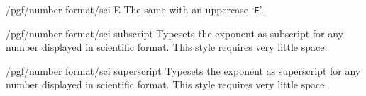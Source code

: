 \begin{key}{/pgf/number format/sci E}
    The same with an uppercase `\texttt{E}'.
\begin{codeexample}[pre={\begin{lateximage}},post={\end{lateximage}}]
\end{codeexample}
\end{key}

\begin{key}{/pgf/number format/sci subscript}
    Typesets the exponent as subscript for any number displayed in scientific
    format. This style requires very little space.
\begin{codeexample}[pre={\begin{lateximage}},post={\end{lateximage}}]
\end{codeexample}
\end{key}

\begin{key}{/pgf/number format/sci superscript}
    Typesets the exponent as superscript for any number displayed in scientific
    format. This style requires very little space.
\begin{codeexample}[pre={\begin{lateximage}},post={\end{lateximage}}]
\end{codeexample}
\end{key}

